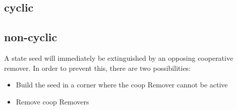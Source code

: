         \subsection{cyclic}

        \subsection{non-cyclic}
            \begin{itemize}
                {
                    \color{red}
                    \item A state seed will immediately be extinguished by an opposing cooperative remover. In order to prevent this, there are two possibilities:
                        \begin{itemize}
                            \item Build the seed in a corner where the coop Remover cannot be active
                            \item Remove coop Removers
                        \end{itemize}
                }
            \end{itemize}
%
%
